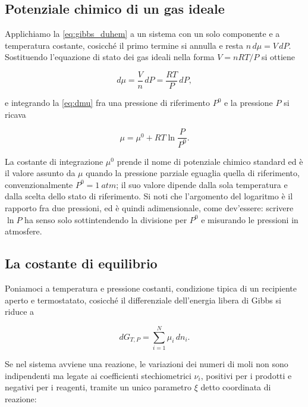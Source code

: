 \subsection{Potenziale chimico di un gas ideale}

Applichiamo la \eqref{eq:gibbs_duhem} a un sistema con un solo componente e a temperatura costante, cosicché il primo termine si annulla e resta $n\,d\mu = V\,dP$.
Sostituendo l'equazione di stato dei gas ideali nella forma $V = nRT/P$ si ottiene

\begin{equation}
    d\mu = \frac{V}{n}\,dP = \frac{RT}{P}\,dP ,
    \label{eq:dmu}
\end{equation}

e integrando la \eqref{eq:dmu} fra una pressione di riferimento $P^0$ e la pressione $P$ si ricava

\begin{equation}
    \mu = \mu^0 + RT\ln\frac{P}{P^0} .
    \label{eq:mu_gas}
\end{equation}

La costante di integrazione $\mu^0$ prende il nome di potenziale chimico standard ed è il valore assunto da $\mu$ quando la pressione parziale eguaglia quella di riferimento, convenzionalmente $P^0 = 1 \ atm$; il suo valore dipende dalla sola temperatura e dalla scelta dello stato di riferimento.
Si noti che l'argomento del logaritmo è il rapporto fra due pressioni, ed è quindi adimensionale, come dev'essere: scrivere $\ln P$ ha senso solo sottintendendo la divisione per $P^0$ e misurando le pressioni in atmosfere.

\subsection{La costante di equilibrio}

Poniamoci a temperatura e pressione costanti, condizione tipica di un recipiente aperto e termostatato, cosicché il differenziale dell'energia libera di Gibbs si riduce a

\begin{equation}
    dG_{T,P} = \sum_{i=1}^{N}\mu_i\,dn_i .
    \label{eq:dG_TP}
\end{equation}

Se nel sistema avviene una reazione, le variazioni dei numeri di moli non sono indipendenti ma legate ai coefficienti stechiometrici $\nu_i$, positivi per i prodotti e negativi per i reagenti, tramite un unico parametro $\xi$ detto coordinata di reazione:

